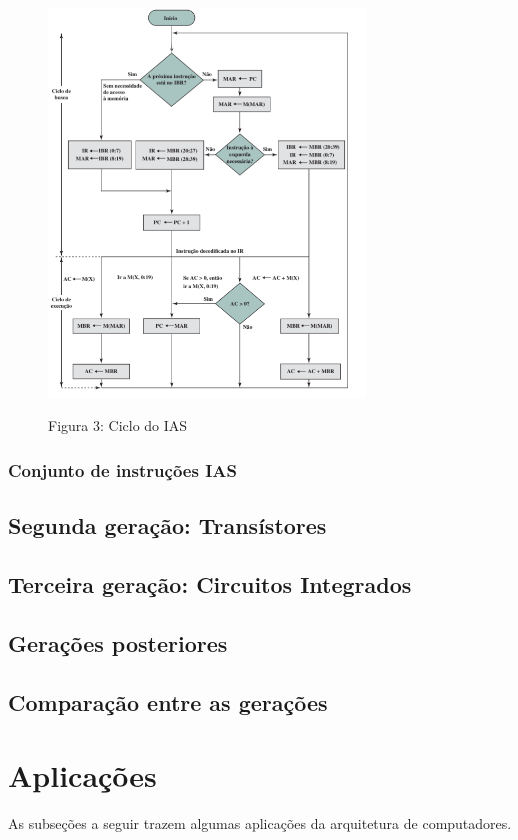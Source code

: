 \documentclass{article}
\begin{document}
\begin{figure}[h]
	\caption{Figura 3: Ciclo do IAS}\textbf{}
	\centering
	\includegraphics[width=0.75\textwidth]{cicloDoIAS.png}
\end{figure}

\subsubsection{Conjunto de instruções IAS}
\subsection{Segunda geração: Transístores}
\subsection{Terceira geração: Circuitos Integrados}
\subsection{Gerações posteriores}
\subsection{Comparação entre as gerações}

\section{Aplicações} 
As subseções a seguir trazem algumas aplicações da arquitetura de computadores.
\end{document}
